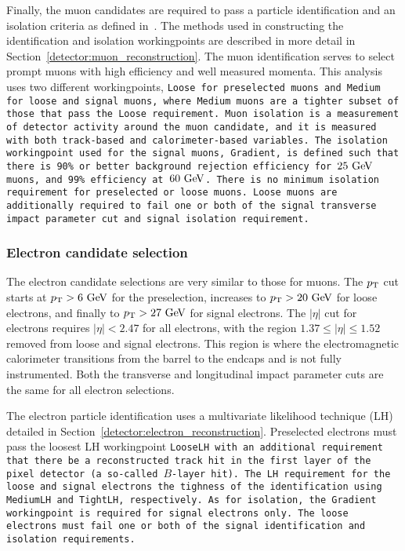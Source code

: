 Finally, the muon candidates are required to pass a particle identification and an isolation criteria as defined in~\cite{2016.muon-reconstruction-13tev}.
The methods used in constructing the identification and isolation workingpoints are described in more detail in Section~\ref{detector:muon_reconstruction}.
The muon identification serves to select prompt muons with high efficiency and well measured momenta.%
This analysis uses two different workingpoints, \tt{Loose} for preselected muons and \tt{Medium} for loose and signal muons, where \tt{Medium} muons are a tighter subset of those that pass the \tt{Loose} requirement.
Muon isolation is a measurement of detector activity around the muon candidate, and it is measured with both track-based and calorimeter-based variables.
The isolation workingpoint used for the signal muons, \tt{Gradient}, is defined such that there is 90\% or better background rejection efficiency for $25\gev$ muons, and 99\% efficiency at $60\gev$.
There is no minimum isolation requirement for preselected or loose muons.
Loose muons are additionally required to fail one or both of the signal transverse impact parameter cut and signal isolation requirement.



\subsubsection{Electron candidate selection}
The electron candidate selections are very similar to those for muons.
The $p_{\mathrm{T}}$ cut starts at $\pt > 6\gev$ for the preselection, increases to $\pt > 20\gev$ for loose electrons, and finally to $\pt > 27\gev$ for signal electrons.
The $|\eta|$ cut for electrons requires $|\eta| < 2.47$ for all electrons, with the region $1.37 \le |\eta| \le 1.52$ removed from loose and signal electrons.
This region is where the electromagnetic calorimeter transitions from the barrel to the endcaps and is not fully instrumented.
Both the transverse and longitudinal impact parameter cuts are the same for all electron selections.

The electron particle identification uses a multivariate likelihood technique (LH)~\cite{2016.electron-performance-13tev} detailed in Section~\ref{detector:electron_reconstruction}.
Preselected electrons must pass the loosest LH workingpoint \tt{LooseLH} with an additional requirement that there be a reconstructed track hit in the first layer of the pixel detector (a so-called $B$-layer hit).
The LH requirement for the loose and signal electrons the tighness of the identification using \tt{MediumLH} and \tt{TightLH}, respectively.
As for isolation, the \tt{Gradient} workingpoint is required for signal electrons only.
The loose electrons must fail one or both of the signal identification and isolation requirements.

